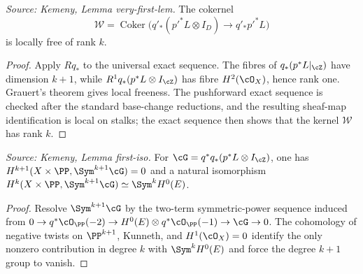\begin{lemma}
  \label{lem:kemeny_W_locally_free}
  \textit{Source: Kemeny, Lemma very-first-lem.}
  The cokernel
  \[
    \mathcal W=\operatorname{Coker}\bigl(q'_*(p'^*L\otimes I_D)\to q'_*p'^*L\bigr)
  \]
  is locally free of rank \(k\).
\end{lemma}
\begin{proof}
  Apply \(Rq_*\) to the universal exact sequence.  The fibres of
  \(q_*(p^*L|_{\cZ})\) have dimension \(k+1\), while
  \(R^1q_*(p^*L\otimes I_{\cZ})\) has fibre \(H^2(\cO_X)\), hence rank one.
  Grauert's theorem gives local freeness.  The pushforward exact sequence is
  checked after the standard base-change reductions, and the resulting
  sheaf-map identification is local on stalks; the exact sequence then shows
  that the kernel \(\mathcal W\) has rank \(k\).
\end{proof}

\begin{lemma}
  \label{lem:kemeny_first_iso}
  \textit{Source: Kemeny, Lemma first-iso.}
  For \(\cG=q^*q_*(p^*L\otimes I_{\cZ})\), one has
  \(H^{k+1}(X\times\PP,\Sym^{k+1}\cG)=0\) and a natural isomorphism
  \(H^k(X\times\PP,\Sym^{k+1}\cG)\simeq \Sym^kH^0(E)\).
\end{lemma}
\begin{proof}
  Resolve \(\Sym^{k+1}\cG\) by the two-term symmetric-power sequence induced
  from \(0\to q^*\cO_{\PP}(-2)\to H^0(E)\otimes q^*\cO_{\PP}(-1)\to\cG\to0\).
  The cohomology of negative twists on \(\PP^{k+1}\), Kunneth, and
  \(H^1(\cO_X)=0\) identify the only nonzero contribution in degree \(k\) with
  \(\Sym^kH^0(E)\) and force the degree \(k+1\) group to vanish.
\end{proof}

